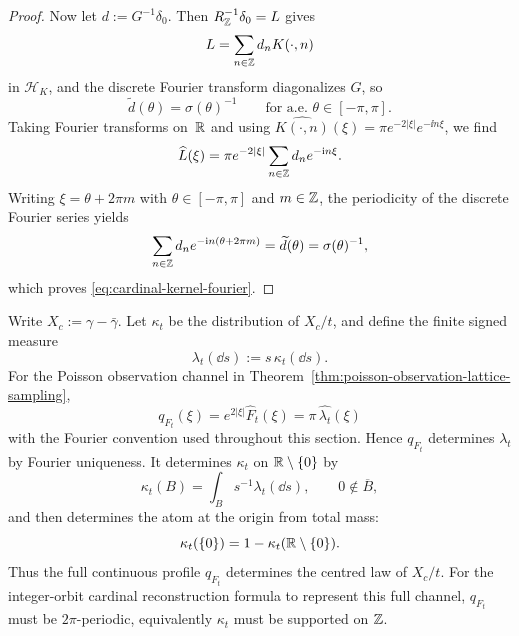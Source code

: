 \begin{proof}
Now let $d:=G^{-1}\delta_0$.  Then $R_{\mathbb{Z}}^{-1}\delta_0=L$ gives
\[
L=\sum_{n\in\mathbb{Z}}d_nK(\cdot,n)
\]
in $\mathcal H_K$, and the discrete Fourier transform diagonalizes $G$,
so
\[
\widetilde d(\theta)=\sigma(\theta)^{-1}
\qquad\text{for a.e. }\theta\in[-\pi,\pi].
\]
Taking Fourier transforms on~$\mathbb{R}$ and using
$\widehat{K(\cdot,n)}(\xi)=\pi e^{-2|\xi|}e^{-\ii n\xi}$, we find
\[
\widehat L(\xi)
=\pi e^{-2|\xi|}\sum_{n\in\mathbb{Z}}d_ne^{-\mathrm{i} n\xi}.
\]
Writing $\xi=\theta+2\pi m$ with $\theta\in[-\pi,\pi]$ and $m\in\mathbb{Z}$,
the periodicity of the discrete Fourier series yields
\[
\sum_{n\in\mathbb{Z}}d_ne^{-\mathrm{i} n(\theta+2\pi m)}
=\widetilde d(\theta)
=\sigma(\theta)^{-1},
\]
which proves \eqref{eq:cardinal-kernel-fourier}.
\end{proof}

\begin{observationprofilelemma}%
\label{lem:observation-profile-determines-law}
Write \(X_c:=\gamma-\bar{\gamma}\).  Let \(\kappa_t\) be the distribution of
\(X_c/t\), and define the finite signed
measure
\[
\lambda_t(\dd s):=s\,\kappa_t(\dd s).
\]
For the Poisson observation channel in
Theorem~\ref{thm:poisson-observation-lattice-sampling},
\[
q_{F_t}(\xi)=e^{2|\xi|}\widehat F_t(\xi)=\pi\,\widehat{\lambda_t}(\xi)
\]
with the Fourier convention used throughout this section.  Hence \(q_{F_t}\)
determines \(\lambda_t\) by Fourier uniqueness.  It determines \(\kappa_t\) on
\(\mathbb{R}\setminus\{0\}\) by
\[
\kappa_t(B)=\int_B s^{-1}\lambda_t(\dd s),
\qquad 0\notin\overline B,
\]
and then determines the atom at the origin from total mass:
\[
\kappa_t(\{0\})=1-\kappa_t(\mathbb{R}\setminus\{0\}).
\]
Thus the full continuous profile \(q_{F_t}\) determines the centred law of
\(X_c/t\).  For the integer-orbit cardinal reconstruction formula to
represent this full channel, \(q_{F_t}\) must be \(2\pi\)-periodic,
equivalently \(\kappa_t\) must be supported on \(\mathbb{Z}\).
\end{observationprofilelemma}

